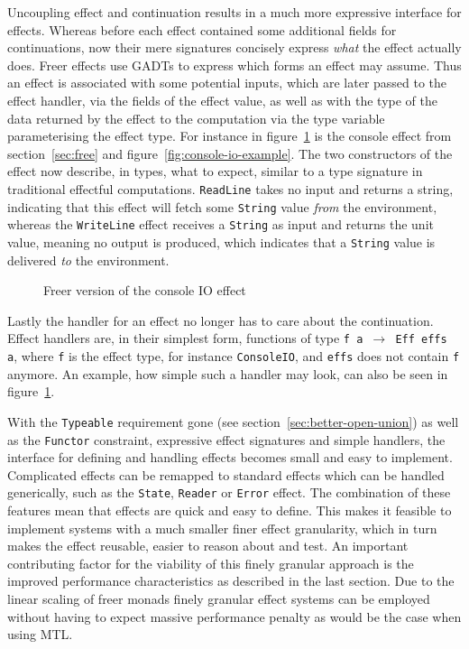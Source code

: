 Uncoupling effect and continuation results in a much more expressive interface
for effects. Whereas before each effect contained some additional fields for
continuations, now their mere signatures concisely express \emph{what} the
effect actually does. Freer effects use GADTs to express which forms an effect
may assume. Thus an effect is associated with some potential inputs, which are
later passed to the effect handler, via the fields of the effect value, as well
as with the type of the data returned by the effect to the computation via the
type variable parameterising the effect type. For instance in
figure~\ref{fig:console-io-freer} is the console effect from
section~\ref{sec:free} and figure~\ref{fig:console-io-example}. The two
constructors of the effect now describe, in types, what to expect, similar to a
type signature in traditional effectful computations. \texttt{ReadLine} takes no
input and returns a string, indicating that this effect will fetch some
\texttt{String} value \emph{from} the environment, whereas the
\texttt{WriteLine} effect receives a \texttt{String} as input and returns the
unit value, meaning no output is produced, which indicates that a
\texttt{String} value is delivered \emph{to} the environment.

\begin{figure}
  
  \caption{Freer version of the console IO effect}
  \label{fig:console-io-freer}
\end{figure}

Lastly the handler for an effect no longer has to care about the continuation.
Effect handlers are, in their simplest form, functions of type \texttt{f a $\rightarrow$
  Eff effs a}, where \texttt{f} is the effect type, for instance
\texttt{ConsoleIO}, and \texttt{effs} does not contain \texttt{f} anymore. An
example, how simple such a handler may look, can also be seen in
figure~\ref{fig:console-io-freer}.

With the \texttt{Typeable} requirement gone (see
section~\ref{sec:better-open-union}) as well as the \texttt{Functor} constraint,
expressive effect signatures and simple handlers, the interface for defining and
handling effects becomes small and easy to implement. Complicated effects can be
remapped to standard effects which can be handled generically, such as the
\texttt{State}, \texttt{Reader} or \texttt{Error} effect. The combination of
these features mean that effects are quick and easy to define. This makes it
feasible to implement systems with a much smaller finer effect granularity,
which in turn makes the effect reusable, easier to reason about and test.
An important contributing factor for the viability of this finely granular
approach is the improved performance characteristics as described in the last
section. Due to the linear scaling of freer monads finely granular effect
systems can be employed without having to expect massive performance penalty as
would be the case when using MTL.
